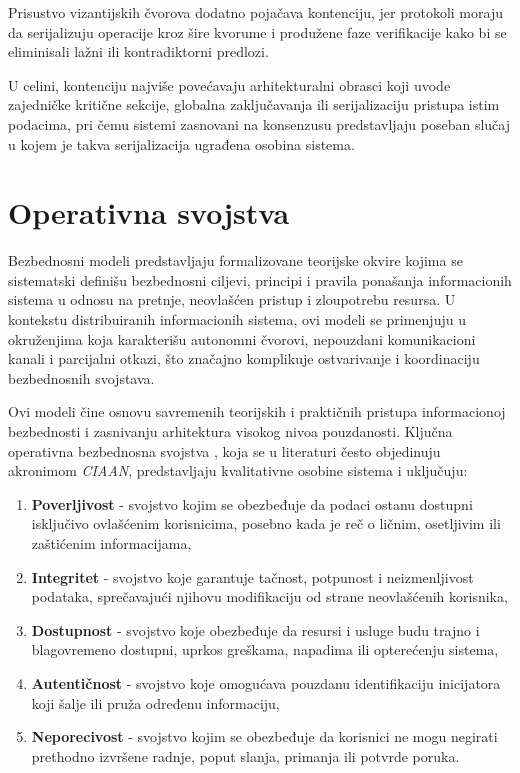Prisustvo vizantijskih čvorova dodatno pojačava kontenciju, jer protokoli moraju da serijalizuju operacije kroz šire kvorume i produžene faze verifikacije kako bi se eliminisali lažni ili kontradiktorni predlozi.

U celini, kontenciju najviše povećavaju arhitekturalni obrasci koji uvode zajedničke kritične sekcije, globalna zaključavanja ili serijalizaciju pristupa istim podacima, pri čemu sistemi zasnovani na konsenzusu predstavljaju poseban slučaj u kojem je takva serijalizacija ugrađena osobina sistema.

\section{Operativna svojstva}
Bezbednosni modeli predstavljaju formalizovane teorijske okvire kojima se sistematski definišu bezbednosni ciljevi, principi i pravila ponašanja informacionih sistema u odnosu na pretnje, neovlašćen pristup i zloupotrebu resursa. U kontekstu distribuiranih informacionih sistema, ovi modeli se primenjuju u okruženjima koja karakterišu autonomni čvorovi, nepouzdani komunikacioni kanali i parcijalni otkazi, što značajno komplikuje ostvarivanje i koordinaciju bezbednosnih svojstava. 

Ovi modeli čine osnovu savremenih teorijskih i praktičnih pristupa informacionoj bezbednosti i zasnivanju arhitektura visokog nivoa pouzdanosti. Ključna operativna bezbednosna svojstva \cite{bishop2002art, sommer2019survey}, koja se u literaturi često objedinuju akronimom \textit{CIAAN}, predstavljaju kvalitativne osobine sistema i uključuju:
\begin{enumerate}
\item \textbf{Poverljivost}  - svojstvo kojim se obezbeđuje da podaci ostanu dostupni isključivo ovlašćenim korisnicima, posebno kada je reč o ličnim, osetljivim ili zaštićenim informacijama,
\item \textbf{Integritet}  - svojstvo koje garantuje tačnost, potpunost i neizmenljivost podataka, sprečavajući njihovu modifikaciju od strane neovlašćenih korisnika,
\item \textbf{Dostupnost}  - svojstvo koje obezbeđuje da resursi i usluge budu trajno i blagovremeno dostupni, uprkos greškama, napadima ili opterećenju sistema,
\item \textbf{Autentičnost}  - svojstvo koje omogućava pouzdanu identifikaciju inicijatora koji šalje ili pruža određenu informaciju,
\item \textbf{Neporecivost}  - svojstvo kojim se obezbeđuje da korisnici ne mogu negirati prethodno izvršene radnje, poput slanja, primanja ili potvrde poruka.
\end{enumerate}

